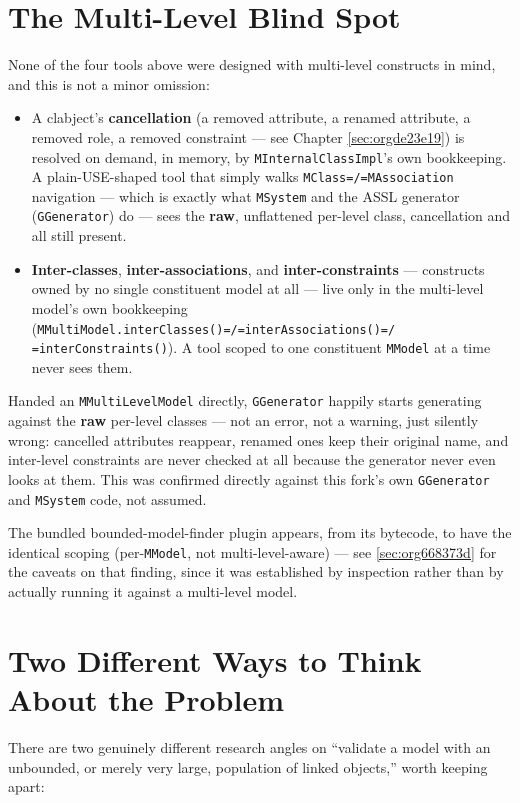 \documentclass[11pt,twoside,a4paper]{book}
\begin{document}
\section{The Multi-Level Blind Spot}
\label{sec:org18aabaf}

None of the four tools above were designed with multi-level constructs
in mind, and this is not a minor omission:

\begin{itemize}
\item A clabject's \textbf{cancellation} (a removed attribute, a renamed
attribute, a removed role, a removed constraint --- see Chapter
\ref{sec:orgde23e19}) is resolved on demand, in memory, by
\texttt{MInternalClassImpl}'s own bookkeeping. A plain-USE-shaped tool that
simply walks \texttt{MClass=/=MAssociation} navigation --- which is exactly
what \texttt{MSystem} and the ASSL generator (\texttt{GGenerator}) do --- sees the
\textbf{raw}, unflattened per-level class, cancellation and all still
present.
\item \textbf{Inter-classes}, \textbf{inter-associations}, and \textbf{inter-constraints} ---
constructs owned by no single constituent model at all --- live only
in the multi-level model's own bookkeeping
(\texttt{MMultiModel.interClasses()=/=interAssociations()=/
  =interConstraints()}). A tool scoped to one constituent \texttt{MModel} at a
time never sees them.
\end{itemize}

Handed an \texttt{MMultiLevelModel} directly, \texttt{GGenerator} happily starts
generating against the \textbf{raw} per-level classes --- not an error, not a
warning, just silently wrong: cancelled attributes reappear, renamed
ones keep their original name, and inter-level constraints are never
checked at all because the generator never even looks at them. This
was confirmed directly against this fork's own \texttt{GGenerator} and
\texttt{MSystem} code, not assumed.

The bundled bounded-model-finder plugin appears, from its bytecode, to
have the identical scoping (per-\texttt{MModel}, not multi-level-aware) --- see
\ref{sec:org668373d} for the caveats on that finding, since it was
established by inspection rather than by actually running it against a
multi-level model.

\section{Two Different Ways to Think About the Problem}
\label{sec:org420d4fa}
There are two genuinely different research angles on ``validate a
model with an unbounded, or merely very large, population of linked
objects,'' worth keeping apart:
\end{document}

